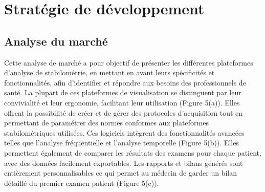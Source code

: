 \section{Stratégie de développement}

\subsection{Analyse du marché}

Cette analyse de marché a pour objectif de présenter les différentes 
plateformes d'analyse de stabilométrie, en mettant en avant leurs spécificités et 
fonctionnalités, afin d’identifier et répondre aux besoins des professionnels de 
santé. 
La plupart de ces plateformes de visualisation se distinguent par leur 
convivialité et leur ergonomie, facilitant leur utilisation (Figure 5(a)).  
Elles offrent la possibilité de créer et de gérer des protocoles d’acquisition 
tout en permettant de paramétrer des normes conformes aux plateformes 
stabilométriques utilisées. Ces logiciels intègrent des fonctionnalités avancées 
telles que l’analyse fréquentielle et l’analyse temporelle (Figure 5(b)). Elles 
permettent également de comparer les résultats des examens pour chaque patient, 
avec des données facilement exportables. Les rapports et bilans générés sont 
entièrement personnalisables ce qui permet au médecin de garder un bilan détaillé 
du premier examen patient (Figure 5(c)).

